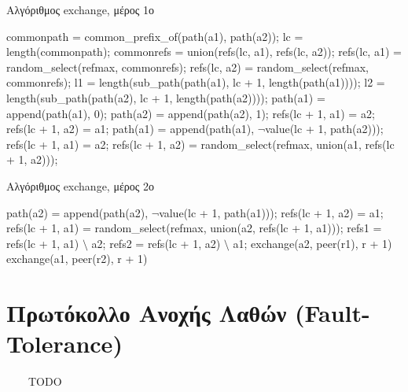 \begin{algorithm}
\caption{Αλγόριθμος exchange, μέρος 1ο}
\label{algo:ExchangePart1}
\begin{algorithmic}[1]
        \State commonpath = common\_prefix\_of(path(a1), path(a2));
        \State lc = length(commonpath);
            \State commonrefs = union(refs(lc, a1), refs(lc, a2));
            \State refs(lc, a1) = random\_select(refmax, commonrefs);
            \State refs(lc, a2) = random\_select(refmax, commonrefs);
            \State l1 = length(sub\_path(path(a1), lc + 1, length(path(a1))));
            \State l2 = length(sub\_path(path(a2), lc + 1, length(path(a2))));            
\newline {}
                \State path(a1) = append(path(a1), 0);
                \State path(a2) = append(path(a2), 1);
                \State refs(lc + 1, a1) = {a2};
                \State refs(lc + 1, a2) = {a1};
            \EndIf
\newline {}
                \State path(a1) = append(path(a1), $\neg$value(lc + 1, path(a2)));
                \State refs(lc + 1, a1) = {a2};
                \State refs(lc + 1, a2) = random\_select(refmax, union({a1}, refs(lc + 1, a2)));
            \EndIf
{}
\end{algorithmic}
\end{algorithm}

\begin{algorithm}[h]
\caption{Αλγόριθμος exchange, μέρος 2ο}
\label{algo:ExchangePart2}
\begin{algorithmic}[1]
\item[] 
                \State path(a2) = append(path(a2), $\neg$value(lc + 1, path(a1)));
                \State refs(lc + 1, a2) = {a1};
                \State refs(lc + 1, a1) = random\_select(refmax, union({a2}, refs(lc + 1, a1)));
            \EndIf
\newline {}
                \State refs1 = refs(lc + 1, a1) $\setminus$ {a2};
                \State refs2 = refs(lc + 1, a2) $\setminus$ {a1};
                        \State exchange(a2, peer(r1), r + 1)
                    \EndIf
                \EndFor
                        \State exchange(a1, peer(r2), r + 1)
                    \EndIf
                \EndFor
            \EndIf
        \EndIf
  \EndProcedure
\end{algorithmic}
\end{algorithm}


\section{Πρωτόκολλο Ανοχής Λαθών (Fault-Tolerance)}

\ \ \ \ TODO
